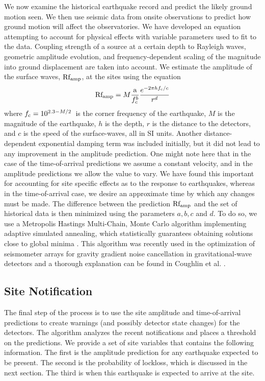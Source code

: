 \documentclass[twocolumn, aps, superscriptaddress]{revtex4}
\begin{document}
We now examine the historical earthquake record and predict the likely ground motion seen. We then use seismic data from onsite observations to predict how ground motion will affect the observatories. We have developed an equation attempting to account for physical effects with variable parameters used to fit to the data. Coupling strength of a source at a certain depth to Rayleigh waves, geometric amplitude evolution, and frequency-dependent scaling of the magnitude into ground displacement are taken into account. We estimate the amplitude of the surface waves, $\rm Rf_{amp}$, at the sites using the equation
\begin{equation}
{\rm Rf_{amp}} = M \frac{\rm a}{f_c^{b}} \frac{e^{-2 \pi h f_{\rm c}/c}}{r^{d}}
\label{eq:Rfamp} 
\end{equation}
where $f_{\rm c} = 10^{2.3-M/2}\,\rm$ is the corner frequency of the earthquake,  $M$ is the magnitude of the earthquake, $h$ is the depth, $r$ is the distance to the detectors, and $c$ is the speed of the surface-waves, all in SI units. Another distance-dependent exponential damping term was included initially, but it did not lead to any improvement in the amplitude prediction. One might note here that in the case of the time-of-arrival predictions we assume a constant velocity, and in the amplitude predictions we allow the value to vary. We have found this important for accounting for site specific effects as to the response to earthquakes, whereas in the time-of-arrival case, we desire an approximate time by which any changes must be made.
The difference between the prediction ${\rm Rf_{amp}}$ and the set of historical data is then minimized using the parameters $a,b,c$ and $d$.
To do so, we use a Metropolis Hastings Multi-Chain, Monte Carlo algorithm implementing adaptive simulated annealing, which statistically guarantees obtaining solutions close to global minima \cite{KiGe1983,In2000}. This algorithm was recently used in the optimization of seismometer arrays for gravity gradient noise cancellation in gravitational-wave detectors and a thorough explanation can be found in Coughlin et al. \cite{CoMu2016}. 

\subsection{Site Notification}
The final step of the process is to use the site amplitude and time-of-arrival predictions to create warnings (and possibly detector state changes) for the detectors. The algorithm analyzes the recent notifications and places a threshold on the predictions. We provide a set of site variables that contains the following information. The first is the amplitude prediction for any earthquake expected to be present.
The second is the probability of lockloss, which is discussed in the next section. The third is when this earthquake is expected to arrive at the site.
		
\end{document}
